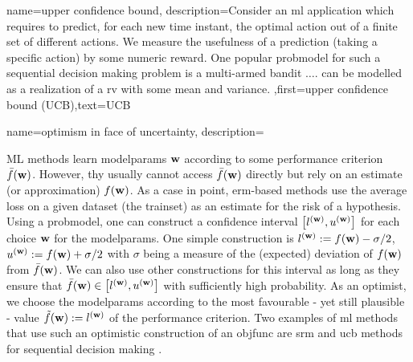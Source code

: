 {name={upper confidence bound},
	description={Consider an \gls{ml} 
		application which requires to predict, for each new time instant,
		 the optimal action out of a finite set of different actions. We measure the usefulness 
		 of a \gls{prediction} (taking a specific action) by some numeric reward. 
		 One popular \gls{probmodel} for such a sequential decision making problem 
		 is a multi-armed bandit $\ldots$. can be modelled as a realization of a \gls{rv} 
		 with some mean and variance. },first={upper confidence bound (UCB)},text={UCB} 
}


{name={optimism in face of uncertainty},
	description={ML  methods learn \gls{modelparams} ${\bf w}$ 
		according to some performance criterion $\bar{f}({\bf w})$. However, thy usually 
		cannot access $\bar{f}({\bf w})$ directly but rely on an estimate (or approximation) $f({\bf w})$. 
		As a case in point, \gls{erm}-based methods use the average \gls{loss} on a given \gls{dataset} (the \gls{trainset}) 
		as an estimate for the \gls{risk} of a \gls{hypothesis}. Using a \gls{probmodel}, one can construct 
		a confidence interval 
	$\big[ l^{({\bf w})},  u^{({\bf w})} \big]$ for each choice ${\bf w}$ for the \gls{modelparams}.
	One simple construction is $l^{({\bf w})} := f({\bf w}) - \sigma/2$, $u^{({\bf w})} := f({\bf w})+ \sigma/2$ 
	with $\sigma$ being a measure of the (expected) deviation of $f({\bf w})$ from $\bar{f}({\bf w})$. 
	We can also use other constructions for this interval as long as they ensure that $\bar{f}({\bf w}) \in\big[ l^{({\bf w})},  u^{({\bf w})} \big]$ 
	with sufficiently high probability. As an optimist, we choose the \gls{modelparams} 
	according to the most favourable - yet still plausible - value $\tilde{f}({\bf w}) :=  l^{({\bf w})}$ of the performance criterion. 
	Two examples of \gls{ml} methods that use such an optimistic construction of an \gls{objfunc} 
	are \gls{srm} \cite[Ch. 11]{ShalevMLBook} and \gls{ucb} methods for sequential decision making \cite[Sec. 2.2]{Bubeck2012}. 
		\begin{figure}[htbp]
				\begin{center}
\end{center}
\end{figure}}}
